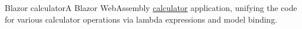 \datedsubsectionnarrow{}
{Blazor calculator}{}{A Blazor WebAssembly \href{https://github.com/jacobarchambault/blazorcalculator}{calculator} application, unifying the code for various calculator operations via lambda expressions and model binding.}
